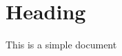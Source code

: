 \documentclass[11pt,a4paper]{scrartcl}		%
\begin{document}

	\section*{Heading}
	
	This is a simple document
\end{document}
